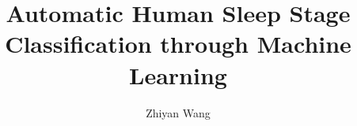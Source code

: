 %
%
%
%
%
%
%
%
%
%
%
%

\documentclass[11pt]{article}

\usepackage[english]{babel}
\usepackage[utf8]{inputenc}
\usepackage[colorlinks = true,
            linkcolor = blue,
            urlcolor  = blue]{hyperref}
\usepackage[a4paper,margin=1.5in]{geometry}
\usepackage{booktabs}
\usepackage{stackengine,graphicx}
\usepackage{fancyhdr}
\setlength{\headheight}{15pt}
\usepackage{microtype}
\usepackage{times}
\usepackage{amsmath}


\frenchspacing
\setlength{\parindent}{0cm} %
\setlength{\parskip}{0.3cm plus1mm minus1mm}

\pagestyle{fancy}
\fancyhf{}
\rfoot{\thepage}

\date{}

\title{\vspace{-1cm}Automatic Human Sleep Stage Classification through Machine Learning}
\author{Zhiyan Wang}



\maketitle
\vspace{-1cm}
\thispagestyle{fancy}

